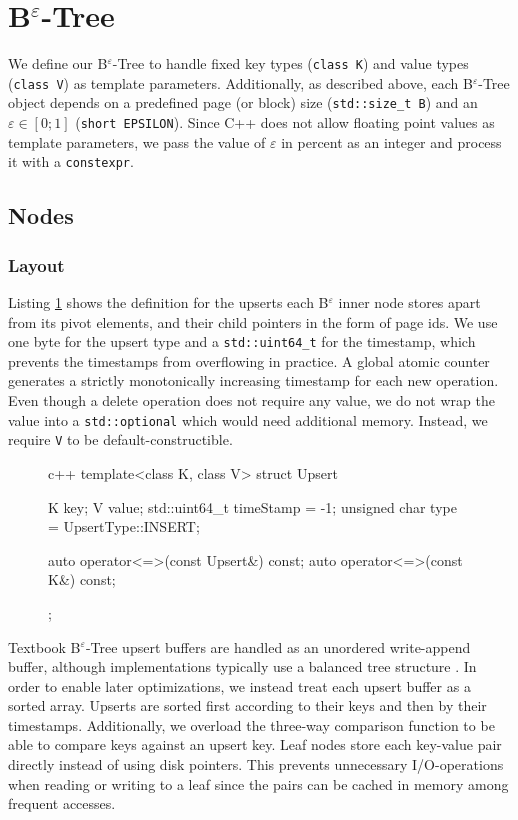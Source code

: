 \section{B$^\varepsilon$-Tree}
We define our B$^\varepsilon$-Tree to handle fixed key types (\texttt{class K}) and value types (\texttt{class V}) as template parameters. Additionally, as described above, each B$^\varepsilon$-Tree object depends on a predefined page (or block) size (\texttt{std::size\_t B}) and an $\varepsilon \in [0;1]$ (\texttt{short EPSILON}). Since C++ does not allow floating point values as template parameters, we pass the value of $\varepsilon$ in percent as an integer and process it with a \texttt{constexpr}.

\subsection{Nodes}\label{5.2.1}

\subsubsection{Layout}

Listing \ref{fig:upsert_struct} shows the definition for the upserts each B$^\varepsilon$ inner node stores apart from its pivot elements, and their child pointers in the form of page ids. We use one byte for the upsert type and a \texttt{std::uint64\_t} for the timestamp, which prevents the timestamps from overflowing in practice. A global atomic counter generates a strictly monotonically increasing timestamp for each new operation. Even though a delete operation does not require any value, we do not wrap the value into a \texttt{std::optional} which would need additional memory. Instead, we require \texttt{V} to be default-constructible.

\begin{figure}[h]
	\centering
	\label{fig:upsert_struct}
	\vspace*{5mm}
	\begin{cminted}[linenos=false]{c++}
template<class K, class V>
struct Upsert {
    K key;
    V value;
    std::uint64_t timeStamp = -1;
    unsigned char type = UpsertType::INSERT;
    
    auto operator<=>(const Upsert&) const;
    auto operator<=>(const K&) const;
};
	\end{cminted}
\end{figure}

Textbook B$^\varepsilon$-Tree upsert buffers are handled as an unordered write-append buffer, although implementations typically use a balanced tree structure \cite{b_epsilon_tree}. In order to enable later optimizations, we instead treat each upsert buffer as a sorted array. Upserts are sorted first according to their keys and then by their timestamps. Additionally, we overload the three-way comparison function to be able to compare keys against an upsert key.\newline
Leaf nodes store each key-value pair directly instead of using disk pointers. This prevents unnecessary I/O-operations when reading or writing to a leaf since the pairs can be cached in memory among frequent accesses.

